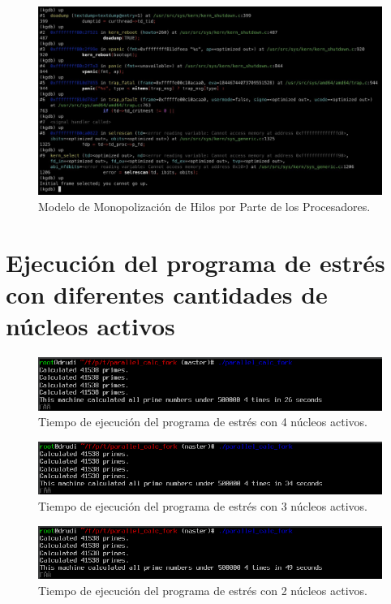 \vspace{.50cm}
\begin{figure}[H]
    \centering
    \includegraphics[width=1\textwidth]{images/kgdb_kern-select.jpeg}
    \caption{Modelo de Monopolización de Hilos por Parte de los Procesadores.}
    \label{fig:kgdb_kern-select}
\end{figure}

\section{Ejecución del programa de estrés con diferentes cantidades de núcleos activos}\label{appendix:apD}

\begin{figure}[H]
    \centering
    \includegraphics[width=1\textwidth]{images/cpuOnOff-4CPUsTime.png}
    \caption{Tiempo de ejecución del programa de estrés con 4 núcleos activos.}
    \label{fig:cpuOnOff-4CPUsTime}
\end{figure}

\begin{figure}[H]
    \centering
    \includegraphics[width=1\textwidth]{images/cpuOnOff-3CPUsTime.png}
    \caption{Tiempo de ejecución del programa de estrés con 3 núcleos activos.}
    \label{fig:cpuOnOff-3CPUsTime}
\end{figure}

\begin{figure}[H]
    \centering
    \includegraphics[width=1\textwidth]{images/cpuOnOff-2CPUsTime.png}
    \caption{Tiempo de ejecución del programa de estrés con 2 núcleos activos.}
    \label{fig:cpuOnOff-2CPUsTime}
\end{figure}





